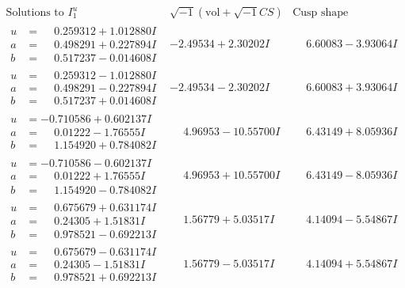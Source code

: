 \documentclass[1p]{elsarticle_modified}
\theoremstyle{definition}
\newcommand{\I}{\sqrt{-1}}
\begin{document}
$$\begin{array}{c|c|c}  
\text{Solutions to }I^u_{1}& \I (\text{vol} + \sqrt{-1}CS) & \text{Cusp shape}\\
 \hline 
\begin{aligned}
u &= \phantom{-}0.259312 + 1.012880 I \\
a &= \phantom{-}0.498291 + 0.227894 I \\
b &= \phantom{-}0.517237 - 0.014608 I\end{aligned}
 & -2.49534 + 2.30202 I & \phantom{-}6.60083 - 3.93064 I \\ \hline\begin{aligned}
u &= \phantom{-}0.259312 - 1.012880 I \\
a &= \phantom{-}0.498291 - 0.227894 I \\
b &= \phantom{-}0.517237 + 0.014608 I\end{aligned}
 & -2.49534 - 2.30202 I & \phantom{-}6.60083 + 3.93064 I \\ \hline\begin{aligned}
u &= -0.710586 + 0.602137 I \\
a &= \phantom{-}0.01222 - 1.76555 I \\
b &= \phantom{-}1.154920 + 0.784082 I\end{aligned}
 & \phantom{-}4.96953 - 10.55700 I & \phantom{-}6.43149 + 8.05936 I \\ \hline\begin{aligned}
u &= -0.710586 - 0.602137 I \\
a &= \phantom{-}0.01222 + 1.76555 I \\
b &= \phantom{-}1.154920 - 0.784082 I\end{aligned}
 & \phantom{-}4.96953 + 10.55700 I & \phantom{-}6.43149 - 8.05936 I \\ \hline\begin{aligned}
u &= \phantom{-}0.675679 + 0.631174 I \\
a &= \phantom{-}0.24305 + 1.51831 I \\
b &= \phantom{-}0.978521 - 0.692213 I\end{aligned}
 & \phantom{-}1.56779 + 5.03517 I & \phantom{-}4.14094 - 5.54867 I \\ \hline\begin{aligned}
u &= \phantom{-}0.675679 - 0.631174 I \\
a &= \phantom{-}0.24305 - 1.51831 I \\
b &= \phantom{-}0.978521 + 0.692213 I\end{aligned}
 & \phantom{-}1.56779 - 5.03517 I & \phantom{-}4.14094 + 5.54867 I \\ \hline\begin{aligned}

\end{aligned}
\end{array}$$
\end{document}

